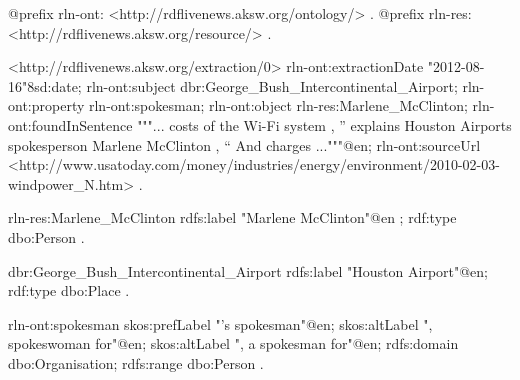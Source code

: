 @prefix rln-ont: <http://rdflivenews.aksw.org/ontology/> .
@prefix rln-res: <http://rdflivenews.aksw.org/resource/> .
    
<http://rdflivenews.aksw.org/extraction/0>
   rln-ont:extractionDate  "2012-08-16"^^xsd:date;
   rln-ont:subject         dbr:George_Bush_Intercontinental_Airport;
   rln-ont:property        rln-ont:spokesman;
   rln-ont:object          rln-res:Marlene_McClinton;
   rln-ont:foundInSentence """... costs of the Wi-Fi system , '' explains Houston Airports spokesperson Marlene McClinton , `` And charges ..."""@en;
   rln-ont:sourceUrl       <http://www.usatoday.com/money/industries/energy/environment/2010-02-03-windpower_N.htm> .

rln-res:Marlene_McClinton	
    rdfs:label  "Marlene McClinton"@en ;
    rdf:type    dbo:Person .

dbr:George_Bush_Intercontinental_Airport	
    rdfs:label  "Houston Airport"@en;
    rdf:type    dbo:Place .

rln-ont:spokesman
    skos:prefLabel "'s spokesman"@en;
    skos:altLabel ", spokeswoman for"@en;
    skos:altLabel ", a spokesman for"@en;
    rdfs:domain dbo:Organisation;
    rdfs:range dbo:Person .